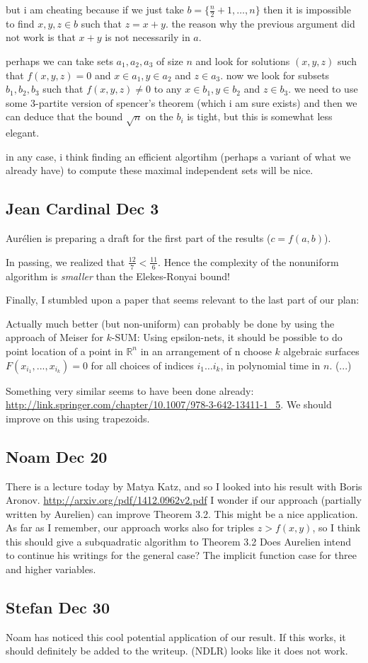 but i am cheating because if we just take
$b=\{\frac{n}{2}+1,\ldots,n\}$ then it is
impossible to find $x,y,z \in b$ such that $z=x+y$. the reason why the previous
argument did not work is that $x+y$ is not necessarily in $a$.

perhaps we can take sets $a_1, a_2, a_3$ of size $n$ and look for solutions
$(x,y,z)$ such that $f(x,y,z)=0$ and
$x\in a_1, y\in a_2$ and $z\in a_3$. now we look for subsets $b_1,b_2, b_3$ such
that
$f(x,y,z) \ne 0$ to any $x\in b_1, y\in b_2$ and $z\in b_3$. we need to use some
3-partite version of spencer's theorem (which i am sure exists) and then we
can deduce that the bound $\sqrt n$ on the $b_i$ is tight, but this is somewhat
less elegant.


in any case, i think finding an efficient algortihm (perhaps a variant of
what we already have) to compute these maximal independent sets will be
nice.

\subsection{Jean Cardinal Dec 3}

Aurélien is preparing a draft for the first part of the results
($c = f(a,b)$).

In passing, we realized that \(\frac{12}{7} < \frac{11}{6}\). Hence the
complexity of the nonuniform algorithm is \emph{smaller} than the Elekes-Ronyai
bound!

Finally, I stumbled upon a paper that seems relevant to the last part of
our plan:

\begin{displayquote}
Actually much better (but non-uniform) can probably be done by using
the approach of Meiser for $k$-SUM: Using epsilon-nets, it should be
possible to do point location of a point in $\mathbb{R}^n$ in an arrangement of n
choose $k$ algebraic surfaces $F(x_{i_1},...,x_{i_k})=0$ for all choices of
indices $i_1 \ldots i_k$, in polynomial time in $n$. (...)
\end{displayquote}

Something very similar seems to have been done already:
\url{http://link.springer.com/chapter/10.1007/978-3-642-13411-1\_5}.
We should improve on this using trapezoids.

\subsection{Noam Dec 20}

There is a lecture today by Matya Katz, and so I looked into his
result with Boris Aronov. \url{http://arxiv.org/pdf/1412.0962v2.pdf}
I wonder if our approach (partially written by Aurelien) can improve
Theorem 3.2. This might be a nice application. As far as I remember,
our approach works also for triples $z>f(x,y)$, so I think this should
give a subquadratic algorithm to Theorem 3.2
Does Aurelien intend to continue his writings for the general case?
The implicit function case for three and higher variables.

\subsection{Stefan Dec 30}

Noam has noticed this cool potential application of our result. If
this works, it should definitely be added to the writeup.
(NDLR) looks like it does not work.
